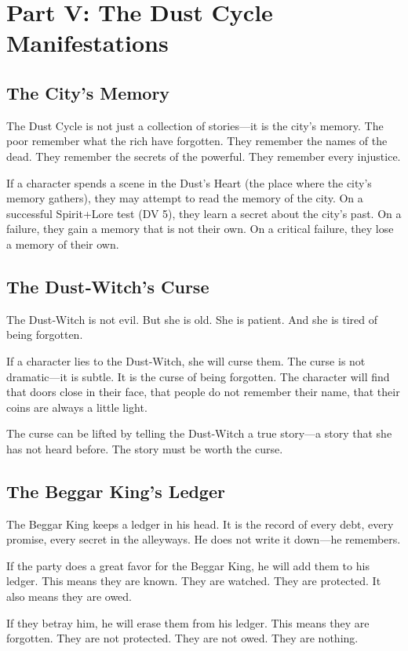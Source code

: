 \documentclass[11pt]{article}
\begin{document}
\section{Part V: The Dust Cycle Manifestations}
\subsection{The City's Memory}
The Dust Cycle is not just a collection of stories—it is the city’s memory. The poor remember what the rich have forgotten. They remember the names of the dead. They remember the secrets of the powerful. They remember every injustice.

If a character spends a scene in the Dust’s Heart (the place where the city’s memory gathers), they may attempt to read the memory of the city. On a successful Spirit+Lore test (DV 5), they learn a secret about the city’s past. On a failure, they gain a memory that is not their own. On a critical failure, they lose a memory of their own.

\subsection{The Dust‑Witch's Curse}
The Dust‑Witch is not evil. But she is old. She is patient. And she is tired of being forgotten.

If a character lies to the Dust‑Witch, she will curse them. The curse is not dramatic—it is subtle. It is the curse of being forgotten. The character will find that doors close in their face, that people do not remember their name, that their coins are always a little light.

The curse can be lifted by telling the Dust‑Witch a true story—a story that she has not heard before. The story must be worth the curse.

\subsection{The Beggar King's Ledger}
The Beggar King keeps a ledger in his head. It is the record of every debt, every promise, every secret in the alleyways. He does not write it down—he remembers.

If the party does a great favor for the Beggar King, he will add them to his ledger. This means they are known. They are watched. They are protected. It also means they are owed.

If they betray him, he will erase them from his ledger. This means they are forgotten. They are not protected. They are not owed. They are nothing.
\end{document}
